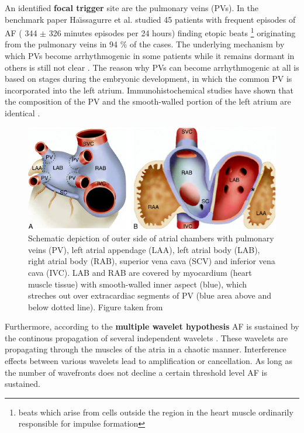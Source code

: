 \documentclass[type=dr, dr=rernat, accentcolor=tud7b,colorbacktitle, bigchapter, openright, twoside, 12pt ]{tudthesis}
\begin{document}
An identified \textbf{focal trigger} site are the pulmonary veins (PVs). In the benchmark paper Ha\"{\i}ssagurre et al. \cite{Hai98} studied 
45 patients with frequent episodes of AF ( 344 $\pm$ 326 minutes episodes per 24 hours) finding etopic beats \footnote{beats which arise 
from cells outside the region in the heart muscle ordinarily responsible for impulse formation} originating from the pulmonary veins in 
94 \% of the cases. The underlying mechanism by which PVs become arrhythmogenic in some patients while it remains dormant in others is 
still not clear \cite{CE09}. The reason why PVs can become arrhythmogenic at all is based on stages during the embryonic development, in 
which the common PV is incorporated into the left atrium. Immunohistochemical studies have shown that the composition of the PV and the 
smooth-walled portion of the left atrium are identical \cite{CE09} \cite{Dou06}. 

\begin{figure}[H]
\begin{center}
\includegraphics[scale=4.0]{PVatriumTissue.png}
\caption{Schematic depiction of outer side of atrial chambers with pulmonary veins (PV), left atrial appendage (LAA), left atrial body (LAB), 
right atrial body (RAB), superior vena cava (SCV) and inferior vena cava (IVC). LAB and RAB are covered by myocardium (heart muscle tissue) 
with smooth-walled inner aspect (blue), which streches out over extracardiac segments of PV (blue area above and below dotted line). Figure 
taken from \cite{Dou06}}
\end{center}
\end{figure}

Furthermore, according to the \textbf{multiple wavelet hypothesis} AF is sustained by the continous propagation of  several independent 
wavelets \cite{CE09}. These wavelets are propagating through the muscles of the atria in a chaotic manner. Interference effects between 
various wavelets lead to amplification or cancellation. As long as the number of wavefronts does not decline a certain threshold level AF 
is sustained.\newline
\end{document}
